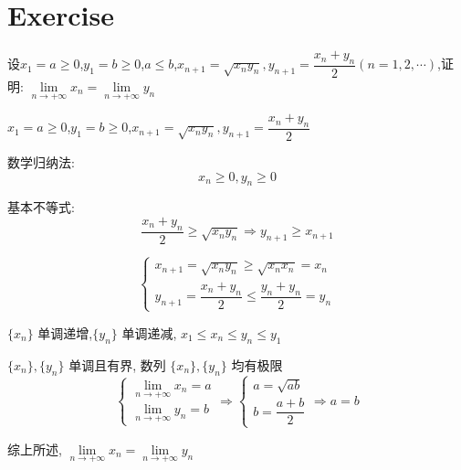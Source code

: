 \section{Exercise}
\begin{proposition}
	设$x_{1}=a\geq 0$,$y_{1}=b\geq 0$,$a\leq b$,$x_{n+1}=\sqrt{x_{n}y_{n}},y_{n+1}=\dfrac{x_{n}+y_{n}}{2}(n=1,2,\cdots)$,证明:
	$\lim\limits_{n\rightarrow +\infty}x_{n}=\lim\limits_{n\rightarrow +\infty}y_{n}$
\end{proposition}
\begin{solution}
	
	$x_{1}=a\geq 0$,$y_{1}=b\geq 0$,$x_{n+1}=\sqrt{x_{n}y_{n}},y_{n+1}=\dfrac{x_{n}+y_{n}}{2}$
	
	数学归纳法:  
	$$x_{n}\geq 0, y_{n}\geq 0$$
	
	基本不等式:  
	$$\dfrac{x_{n}+y_{n}}{2}\geq \sqrt{x_{n}y_{n}}\Rightarrow y_{n+1}\geq x_{n+1}$$
	
	$$
	\begin{cases}
		x_{n+1}=\sqrt{x_{n}y_{n}}\geq \sqrt{x_{n}x_{n}} = x_{n}\\
		y_{n+1}=\dfrac{x_{n}+y_{n}}{2}\leq \dfrac{y_{n}+y_{n}}{2} = y_{n}
	\end{cases}
	$$
	
	$\{x_{n}\}$ 单调递增,$\{y_{n}\}$ 单调递减, $x_{1}\leq x_{n}\leq y_{n}\leq y_{1}$
	
	$\{x_{n}\},\{y_{n}\}$ 单调且有界, 数列 $\{x_{n}\},\{y_{n}\}$ 均有极限 
	$$\begin{cases}
		\lim\limits_{n\rightarrow +\infty}x_{n} = a\\
		\lim\limits_{n\rightarrow +\infty}y_{n} = b
	\end{cases} \Rightarrow 
	\begin{cases}
		a = \sqrt{ab}\\
		b = \dfrac{a+b}{2}
	\end{cases}\Rightarrow a=b$$
	
	综上所述, $\lim\limits_{n\rightarrow +\infty}x_{n}=\lim\limits_{n\rightarrow +\infty}y_{n}$
\end{solution}


